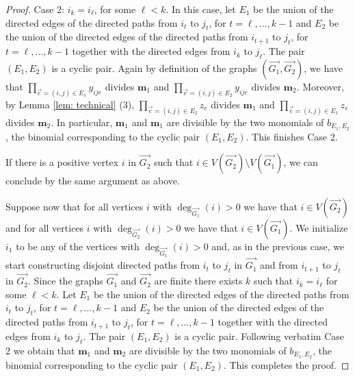 \begin{proof}
     {\sf Case 2:} $i_k=i_{\ell}$, for some ${\ell}<k$. In this case, let $E_1$ be the union of the directed edges of the directed paths from $i_{t}$ to $j_{t}$, for $t=\ell,\dots,k-1$ and $E_2$ be the union of the directed edges of the directed paths from $i_{t+1}$ to $j_t$, for $t=\ell,\dots,k-1$ together with the directed edges from $i_{k}$ to $j_{\ell}$. The pair $(E_1,E_2)$ is a cyclic pair. Again by definition of the graphs $(\overrightarrow{G_1},\overrightarrow{G_2})$, we have that $\prod_{\overset{\to}{e}=(i,j)\in E_1}y_{ije}$ divides $\mathbf{m}_1$ and $\prod_{\overset{\to}{e}=(i,j)\in E_2}y_{ije}$ divides $\mathbf{m}_2$. Moreover, by Lemma \ref{lem: technical} (3), $\prod_{\overset{\to}{e}=(i,j)\in E_2} z_e$ divides $\mathbf{m}_1$ and $\prod_{\overset{\to}{e}=(i,j)\in E_1} z_e$ divides $\mathbf{m}_2$. In particular, $\mathbf{m}_1$ and $\mathbf{m}_1$ are divisible by the two monomials of $b_{E_1,E_2}$, the binomial corresponding to the cyclic pair $(E_1,E_2)$. This finishes Case 2.
     
     If there is a positive vertex $i$ in $\overrightarrow{G_2}$ such that  $i\in V(\overrightarrow{G_2})\setminus V(\overrightarrow{G_1})$, we can conclude by the same argument as above. 
     
     Suppose now that for all vertices $i$ with $\deg_{\overrightarrow{G_1}}(i)>0$ we have that $i\in V(\overrightarrow{G_2})$ and for all vertices $i$ with $\deg_{\overrightarrow{G_2}}(i)>0$ we have that $i\in V(\overrightarrow{G_1})$. We initialize $i_1$ to be any of the vertices with $\deg_{\overrightarrow{G_1}}(i)>0$ and, as in the previous case, we start constructing disjoint directed paths from $i_t$ to $j_{t}$ in $\overrightarrow{G_1}$ and from $i_{t+1}$ to $j_{t}$ in $\overrightarrow{G_2}$. Since the graphs $\overrightarrow{G_1}$ and $\overrightarrow{G_2}$ are finite there exists $k$ such that $i_k=i_{\ell}$ for some $\ell<k$. Let $E_1$ be the union of the directed edges of the directed paths from $i_{t}$ to $j_{t}$, for $t=\ell,\dots,k-1$ and $E_2$ be the union of the directed edges of the directed paths from $i_{t+1}$ to $j_t$, for $t=\ell,\dots,k-1$ together with the directed edges from $i_{k}$ to $j_{\ell}$. The pair $(E_1,E_2)$ is a cyclic pair. Following verbatim Case 2 we obtain that $\mathbf{m}_1$ and $\mathbf{m}_2$ are divisible by the two monomials of $b_{E_1,E_2}$, the binomial corresponding to the cyclic pair $(E_1,E_2)$.
     This completes the proof.
\end{proof}

